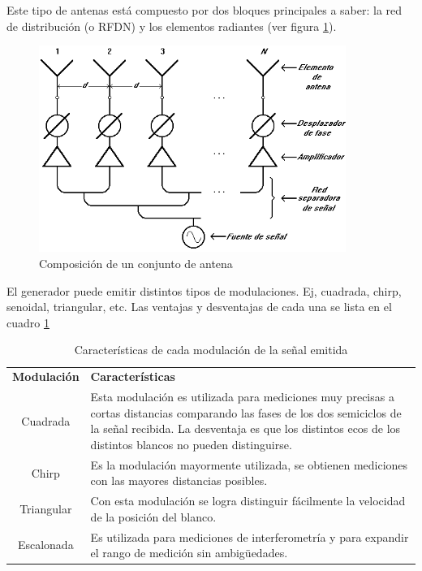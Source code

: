 Este tipo de antenas está compuesto por dos bloques principales a saber: la red de distribución (o RFDN) y los elementos 
radiantes (ver figura \ref{fig:compositionAntenna}).

\begin{figure}[H]
 \centering
 \includegraphics[width=10cm]{gfx/CompositionAntenna.png}
 \caption{Composición de un conjunto de antena}
 \label{fig:compositionAntenna}
\end{figure}

El generador puede emitir distintos tipos de modulaciones. Ej, cuadrada, chirp, senoidal, triangular, etc. Las ventajas y
desventajas de cada una se lista en el cuadro \ref{tab:modulations}

\begin{table}[H]
  \footnotesize
  \centering
  \begin{tabular}{|c|p{9cm}|}
	\hline
	\textbf{Modulación} & \textbf{Características} \\
	Cuadrada & Esta modulación es utilizada para mediciones muy precisas a cortas distancias comparando las fases de los dos
	semiciclos de la señal recibida. La desventaja es que los distintos ecos de los distintos blancos no pueden distinguirse.\\\hline
	Chirp & Es la modulación mayormente utilizada, se obtienen mediciones con las mayores distancias posibles.\\\hline
	Triangular & Con esta modulación se logra distinguir fácilmente la velocidad de la posición del blanco. \\\hline
	Escalonada & Es utilizada para mediciones de interferometría y para expandir el rango de medición sin ambig\"uedades.\\\hline
  \end{tabular}
  \caption{Características de cada modulación de la señal emitida}
  \label{tab:modulations}
\end{table}

